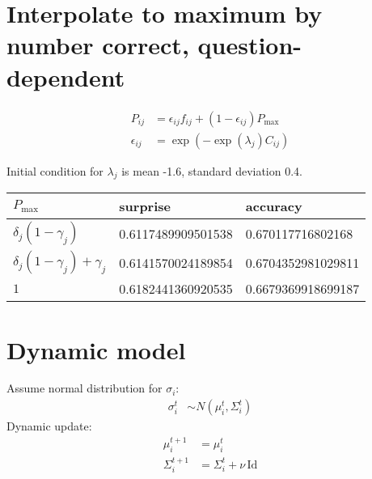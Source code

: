 \documentclass{article}
\begin{document}
\newpage
\section{Interpolate to maximum by number correct, question-dependent}

\begin{align*}
  P_{ij} &= \epsilon_{ij} f_{ij} + (1 - \epsilon_{ij}) P_{\text{max}} \\
  \epsilon_{ij} &= \exp(-\exp(\lambda_j) C_{ij})
\end{align*}

Initial condition for $\lambda_j$ is mean -1.6, standard deviation 0.4.

\begin{center}
  \begin{tabular}{lll}
    $P_{\text{max}}$ & surprise & accuracy \\
    \hline
    $\delta_j (1 - \gamma_j)$ & 0.6117489909501538 & 0.670117716802168 \\
    $\delta_j (1 - \gamma_j) + \gamma_j$ & 0.6141570024189854 & 0.6704352981029811 \\
    $1$ & 0.6182441360920535 & 0.6679369918699187
  \end{tabular}
\end{center}

\begin{center}
\end{center}

\newpage
\section{Dynamic model}

Assume normal distribution for $\sigma_i$:
\begin{align*}
  \sigma_i^t &\sim N(\mu_i^t, \Sigma_i^t)
\end{align*}
Dynamic update:
\begin{align*}
  \mu_i^{t+1} &= \mu_i^t \\
  \Sigma_i^{t+1} &= \Sigma_i^t + \nu\,\text{Id}
\end{align*}
\end{document}

